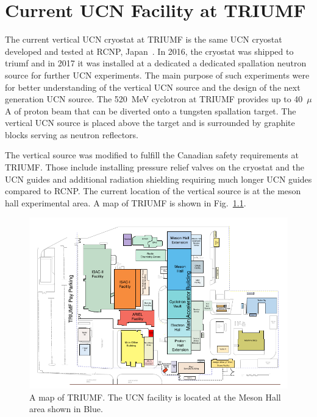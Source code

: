 \chapter{Current UCN Facility at TRIUMF\label{chap:UCNattriumf}}


The current vertical UCN cryostat at TRIUMF is the same UCN cryostat
developed and tested at RCNP,
Japan~\cite{masuda2002spallation,masuda2012spallation}.  In 2016, the
cryostat was shipped to triumf and in 2017 it was installed at a
dedicated a dedicated spallation neutron source for further UCN
experiments. The main purpose of such experiments were for better
understanding of the vertical UCN source and the design of the next
generation UCN source. The 520~MeV cyclotron at TRIUMF provides up to
40~$\mu$A of proton beam that can be diverted onto a tungsten
spallation target. The vertical UCN source is placed above the target
and is surrounded by graphite blocks serving as neutron reflectors.


The vertical source was modified to fulfill the Canadian safety
requirements at TRIUMF. Those include installing pressure relief
valves on the cryostat and the UCN guides and additional radiation
shielding requiring much longer UCN guides compared to RCNP. The
current location of the vertical source is at the meson hall
experimental area. A map of TRIUMF is shown in Fig.~\ref{fig:sitemap}.

\begin{figure}[h!]
  \centering
  \includegraphics[width=1.0\textwidth]{sitemap.png}
  \caption{A map of TRIUMF. The UCN facility is located at the Meson
    Hall area shown in Blue.}
  \label{fig:sitemap}
\end{figure}

